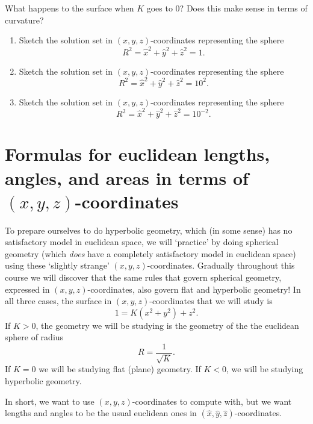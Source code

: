 \documentclass{ximera}
\begin{document}
\begin{problem}
  What happens to the surface when $K$ goes to $0$? Does this make
  sense in terms of curvature?
\end{problem}

\begin{problem}\hfil
\begin{enumerate}
\item Sketch the solution set in $\left(  x,y,z\right)  $-coordinates
representing the sphere%
\[
R^{2}=\hat{x}^{2}+\hat{y}^{2}+\hat{z}^{2}=1.
\]

\item Sketch the solution set in $\left(  x,y,z\right)  $-coordinates
representing the sphere%
\[
R^{2}=\hat{x}^{2}+\hat{y}^{2}+\hat{z}^{2}=10^{2}.
\]

\item Sketch the solution set in $\left(  x,y,z\right)  $-coordinates
representing the sphere%
\[
R^{2}=\hat{x}^{2}+\hat{y}^{2}+\hat{z}^{2}=10^{-2}.
\]
\end{enumerate}
\end{problem}

\section{Formulas for euclidean lengths, angles, and areas in terms of $(x,y,z)$-coordinates}

To prepare ourselves to do hyperbolic geometry, which (in some sense)
has no satisfactory model in euclidean space, we will `practice' by
doing spherical geometry (which \textit{does} have a completely
satisfactory model in euclidean space) using these `slightly strange'
$\left( x,y,z\right) $-coordinates. Gradually throughout this course
we will discover that the same rules that govern spherical geometry,
expressed in $\left( x,y,z\right) $-coordinates, also govern flat and
hyperbolic geometry! In all three cases, the surface in $\left(
x,y,z\right) $-coordinates that we will study is%
\[
1=K(x^{2}+y^{2})+z^{2}.
\]
If $K>0$, the geometry we will be studying is the geometry of the the
euclidean sphere of radius%
\[
R=\frac{1}{\sqrt{K}}.
\]
If $K=0$ we will be studying flat (plane) geometry. If $K<0$, we will be
studying hyperbolic geometry. 

In short, we want to use $\left(  x,y,z\right)  $-coordinates to compute with,
but we want lengths and angles to be the usual euclidean ones in $\left(
\hat{x},\hat{y},\hat{z}\right)  $-coordinates.
\end{document}
